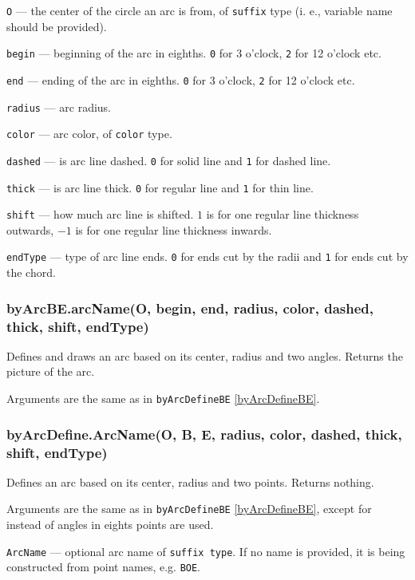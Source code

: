 \documentclass{ltxdoc}
\begin{document}
\texttt{O} — the center of the circle an arc is from, of \texttt{suffix} type (i. e., variable name should be provided).

\texttt{begin} — beginning of the arc in eighths. \texttt{0} for 3 o'clock, \texttt{2} for 12 o'clock etc.

\texttt{end} — ending of the arc in eighths. \texttt{0} for 3 o'clock, \texttt{2} for 12 o'clock etc.

\texttt{radius} — arc radius.

\texttt{color} — arc color, of \texttt{color} type.

\texttt{dashed} — is arc line dashed. \texttt{0} for solid line and \texttt{1} for dashed line.

\texttt{thick} — is arc line thick. \texttt{0} for regular line and \texttt{1} for thin line.

\texttt{shift} — how much arc line is shifted. \texttt{$1$} is for one regular line thickness outwards, \texttt{$-1$} is for one regular line thickness inwards.

\texttt{endType} — type of arc line ends. \texttt{0} for ends cut by the radii and \texttt{1} for ends cut by the chord.

\subsubsection{byArcBE.arcName(O, begin, end, radius, color, dashed, thick, shift, endType)}\label{byArcBE}

	Defines and draws an arc based on its center, radius and two angles. Returns the picture of the arc.
	
	Arguments are the same as in \texttt{byArcDefineBE} \ref{byArcDefineBE}.

\subsubsection{byArcDefine.ArcName(O, B, E, radius, color, dashed, thick, shift, endType)}\label{byArcDefine}
	
	Defines an arc based on its center, radius and two points. Returns nothing.
	
	Arguments are the same as in \texttt{byArcDefineBE} \ref{byArcDefineBE}, except for instead of angles in eights points are used.
	
	\texttt{ArcName} — optional arc name of \texttt{suffix type}. If no name is provided, it is being constructed from point names, e.g. \texttt{BOE}.
	
\end{document}
